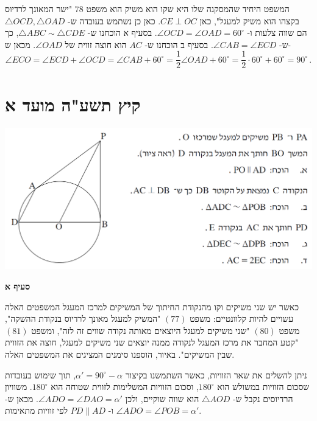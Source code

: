 \documentclass[12pt,a4paper]{article}
\newcommand*{\np}{\selectlanguage{english}\newpage\selectlanguage{hebrew}}
\begin{document}
המשפט היחיד שהמסקנה שלו היא שקו הוא משיק הוא משפט
$78$
"ישר המאונך לרדיוס בקצהו הוא משיק למעגל", כאן
$CE\perp OC$.
כאן כן נשתמש בעובדה ש-%
$\triangle OCD,\triangle OAD$
הם שווה צלעות ו-%
$\angle OCD=\angle OAD=60^\circ$.
בסעיף א הוכחנו ש-%
$\triangle ABC\sim \triangle CDE$,
כך ש-%
$\angle CAB = \angle ECD$.
בסעיף ב הוכחנו ש-%
$AC$
הוא חוצה זווית של
$\angle OAD$.
מכאן ש-%
\[
\angle ECO = \angle ECD + \angle OCD = \angle CAB + 60^\circ = \frac{1}{2}\angle OAD + 60^\circ=\frac{1}{2}\cdot 60^\circ + 60^\circ = 90^\circ\,.
\]


\np


\section{קיץ תשע"ה מועד א}

\begin{center}
\includegraphics[width=\textwidth]{summer-2015a-4}
\end{center}

\vspace{-2ex}
\textbf{סעיף א}


כאשר יש שני משיקים וקו מהנקודת החיתוך של המשיקים למרכז המעגל המשפטים האלה עשויים להיות קלוונטיים: משפט
$(77)$
"המשיק למעגל מאונך לרדיוס בנקודת ההשקה", משפט
$(80)$
"שני משיקים למעגל היוצאים מאותה נקודה שווים זה לזה", ומשפט
$(81)$
"קטע המחבר את מרכז המעגל לנקודה ממנה יוצאים שני משיקים למעגל, חוצה את הזווית שבין המשיקים". באיור, הוספנו סימנים המציגים את המשפטים האלה. 

ניתן להשלים את שאר הזוויות, כאשר השתמשנו בקיצור
$\alpha' = 90^\circ-\alpha$,
תוך שימוש בעובדות שסכום הזוויות במשולש הוא
$180^\circ$,
וסכום הזוויות המשלימות לזווית שטוחה הוא
$180^\circ$.
משוויון הרדיוסים נקבל ש-%
$\triangle AOD$
הוא שווה שוקיים, ולכן
$\angle ADO=\angle DAO=\alpha'$.
מכאן ש-%
$\angle ADO=\angle POB=\alpha'$
ו-%
$PD\|AD$
לפי זוויות מתאימות.
\end{document}
